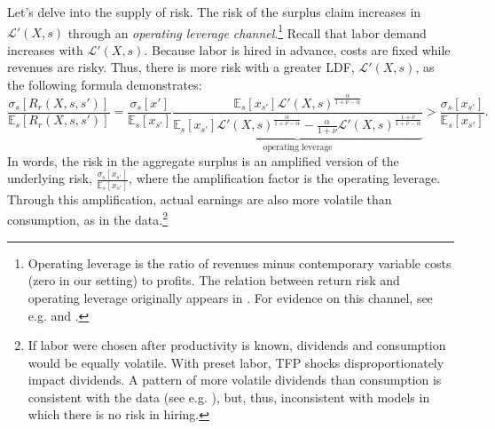 Let's delve into the supply of risk. The risk of the surplus claim increases in $\mathcal{L}'(X,s)$ through an \textit{operating leverage channel}.\footnote{
Operating leverage is the ratio of revenues minus contemporary variable costs (zero in our setting) to profits. 
The relation between return risk and operating leverage originally appears in \citet{lev1974association}. 
For evidence on this channel, see e.g. \citet{novy2010operating} and \citet{donangelo2019cross}.} 
Recall that labor demand increases with $\mathcal{L}'(X,s)$. Because labor is hired in advance, costs are fixed while revenues are risky. Thus, there is more risk with a greater LDF, $\mathcal{L}'(X,s)$, as the following formula demonstrates:
\begin{equation}\label{eq: coef_variation_returns}
    \frac{\sigma_s[R_r(X,s,s')]}{\mathbb{E}_s[R_r(X,s,s')]} = \frac{\sigma_s[x']}{\mathbb{E}_s[x_{s'}]} \underbrace{\frac{\mathbb{E}_s[x_{s'}] \mathcal{L}'(X,s)^\frac{\alpha}{1+\nu-\alpha} }{\mathbb{E}_s[x_{s'}] \mathcal{L}'(X,s)^\frac{\alpha}{1+\nu-\alpha} - \frac{\alpha}{1+\nu} \mathcal{L}'(X,s)^{\frac{1+\nu}{1+\nu-\alpha}} }}_{\text{operating leverage}} > \frac{\sigma_{s}[x_{s'}]}{\mathbb{E}_s[x_{s'}]}.
\end{equation}
In words, the risk in the aggregate surplus is an amplified version of the underlying risk, $\frac{\sigma_{s}[x_{s'}]}{\mathbb{E}_s[x_{s'}]}$, where the amplification factor is the operating leverage. Through this amplification, actual earnings are also more volatile than consumption, as in the data.\footnote{If labor were chosen after productivity is known, dividends and consumption would be equally volatile. With preset labor, TFP shocks disproportionately impact dividends. A pattern of more volatile dividends than consumption is consistent with the data  (see e.g. \citealt{campbell2003consumption}), but, thus, inconsistent with models in which there is no risk in hiring.} 

